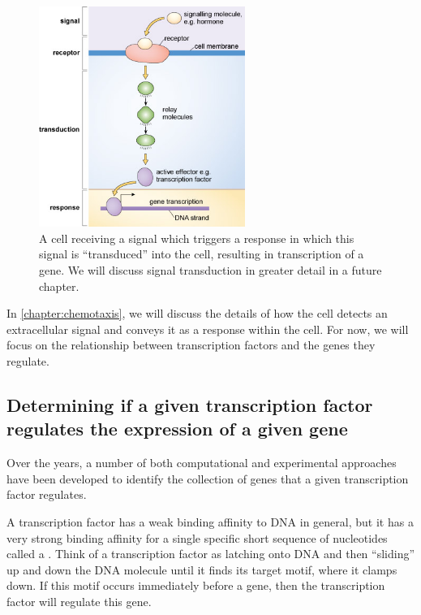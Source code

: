 \begin{figure}[h]
\centering
\mySfFamily
\includegraphics[width = 0.6\textwidth]{../images/signal_pathway.jpg}
\caption{A cell receiving a signal which triggers a response in which this signal is ``transduced'' into the cell, resulting in transcription of a gene. We will discuss signal transduction in greater detail in a future chapter.}
\label{fig:transduction}
\end{figure}

In \autoref{chapter:chemotaxis}, we will discuss the details of how the cell detects an extracellular signal and conveys it as a response within the cell. For now, we will focus on the relationship between transcription factors and the genes they regulate.

\subsection{Determining if a given transcription factor regulates the expression of a given gene}

Over the years, a number of both computational and experimental approaches have been developed to identify the collection of genes that a given transcription factor regulates.

A transcription factor has a weak binding affinity to DNA in general, but it has a very strong binding affinity for a single specific short sequence of nucleotides called a . Think of a transcription factor as latching onto DNA and then ``sliding'' up and down the DNA molecule until it finds its target motif, where it clamps down. If this motif occurs immediately before a gene, then the transcription factor will regulate this gene.

